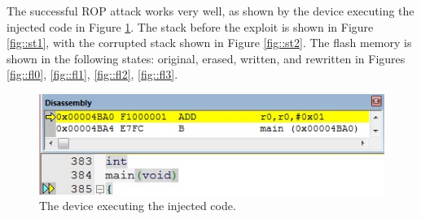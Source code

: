 The successful ROP attack works very well, as shown by the device executing the injected code in Figure \ref{fig::ex}.  The stack before the exploit is shown in Figure \ref{fig::st1}, with the corrupted stack shown in Figure \ref{fig::st2}. The flash memory is shown in the following states: original, erased, written, and rewritten in Figures \ref{fig::fl0}, \ref{fig::fl1}, \ref{fig::fl2}, \ref{fig::fl3}. 
\begin{figure}[htbp]
	\centering
	\includegraphics[scale=0.7]{ex2}
	\caption{The device executing the injected code. }\label{fig::ex}
\end{figure}


